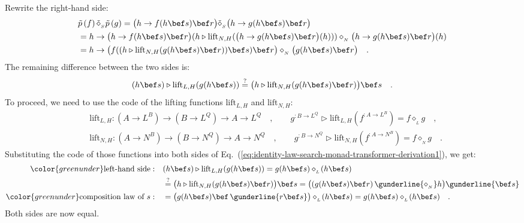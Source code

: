 Rewrite the right-hand side:
\begin{align*}
 & \tilde{p}\left(f\right)\tilde{\diamond}_{_{S}}\tilde{p}\left(g\right)=\big(h\rightarrow f(h\bef s)\bef r\big)\tilde{\diamond}_{_{S}}\big(h\rightarrow g(h\bef s)\bef r\big)\\
 & =h\rightarrow\big(h\rightarrow f(h\bef s)\bef r\big)(h\triangleright\text{lift}_{N,H}(\big(h\rightarrow g(h\bef s)\bef r\big)(h)))\diamond_{_{N}}\big(h\rightarrow g(h\bef s)\bef r\big)(h)\\
 & =h\rightarrow\big(f((h\triangleright\text{lift}_{N,H}(g(h\bef s)\bef r))\bef s)\bef r\big)\diamond_{_{N}}\big(g(h\bef s)\bef r\big)\quad.
\end{align*}
The remaining difference between the two sides is:
\begin{equation}
(h\bef s)\triangleright\text{lift}_{L,H}(g(h\bef s))\overset{?}{=}\big(h\triangleright\text{lift}_{N,H}(g(h\bef s)\bef r)\big)\bef s\quad.\label{eq:identity-law-search-monad-transformer-derivation1}
\end{equation}
To proceed, we need to use the code of the lifting functions $\text{lift}_{L,H}$
and $\text{lift}_{N,H}$:
\begin{align*}
 & \text{lift}_{L,H}:(A\rightarrow L^{B})\rightarrow(B\rightarrow L^{Q})\rightarrow A\rightarrow L^{Q}\quad,\quad\quad g^{:B\rightarrow L^{Q}}\triangleright\text{lift}_{L,H}(f^{:A\rightarrow L^{B}})=f\diamond_{_{L}}g\quad,\\
 & \text{lift}_{N,H}:(A\rightarrow N^{B})\rightarrow(B\rightarrow N^{Q})\rightarrow A\rightarrow N^{Q}\quad,\quad\quad g^{:B\rightarrow N^{Q}}\triangleright\text{lift}_{N,H}(f^{:A\rightarrow N^{B}})=f\diamond_{_{N}}g\quad.
\end{align*}
Substituting the code of those functions into both sides of Eq.~(\ref{eq:identity-law-search-monad-transformer-derivation1}),
we get:
\begin{align*}
{\color{greenunder}\text{left-hand side}:}\quad & (h\bef s)\triangleright\text{lift}_{L,H}(g(h\bef s))=g(h\bef s)\diamond_{_{L}}\!(h\bef s)\\
 & \overset{?}{=}\big(h\triangleright\text{lift}_{N,H}(g(h\bef s)\bef r)\big)\bef s=\big((g(h\bef s)\bef r)\,\gunderline{\diamond_{_{N}}}h\big)\gunderline{\bef s}\\
{\color{greenunder}\text{composition law of }s:}\quad & =\big(g(h\bef s)\bef\,\gunderline{r\bef s}\big)\diamond_{_{L}}\!(h\bef s)=g(h\bef s)\diamond_{_{L}}\!(h\bef s)\quad.
\end{align*}
Both sides are now equal.

